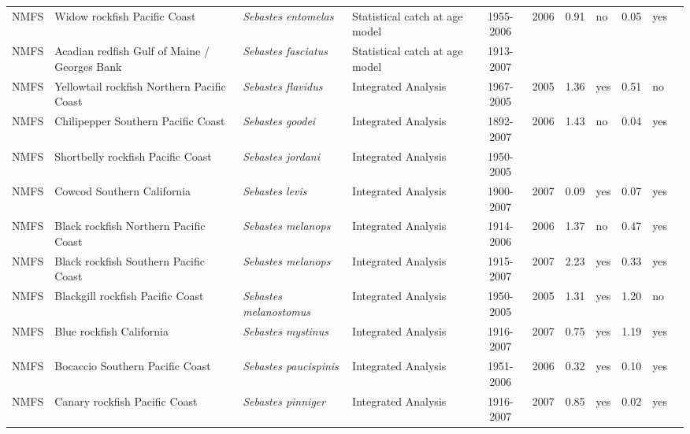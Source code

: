 \begin{longtable}{p{1.8cm}p{3.5cm}p{3.5cm}p{3cm}cccp{0.9cm}cp{0.9cm}c}
  NMFS & Widow rockfish Pacific Coast & \textit{Sebastes entomelas} & Statistical catch at age model & 1955-2006 & 2006 & 0.91 & no & 0.05 & yes & \cite{NWFSC-WROCKPCOAST-2007-widow.pdf} \\ 
  NMFS & Acadian redfish Gulf of Maine / Georges Bank & \textit{Sebastes fasciatus} & Statistical catch at age model & 1913-2007 &  &  &  &  &  & \cite{AcadianRedfish2008.pdf} \\ 
  NMFS & Yellowtail rockfish Northern Pacific Coast & \textit{Sebastes flavidus} & Integrated Analysis & 1967-2005 & 2005 & 1.36 & yes & 0.51 & no & \cite{2005_SAFE_yellowtail.pdf} \\ 
  NMFS & Chilipepper Southern Pacific Coast & \textit{Sebastes goodei} & Integrated Analysis & 1892-2007 & 2006 & 1.43 & no & 0.04 & yes & \cite{NWFSC-CHILISPCOAST-2007-Chilipepper CA OR.pdf} \\ 
  NMFS & Shortbelly rockfish Pacific Coast & \textit{Sebastes jordani} & Integrated Analysis & 1950-2005 &  &  &  &  &  & \cite{SWFSC-SBELLYROCKPCOAST-2007-Shortbelly rockfish.pdf} \\ 
  NMFS & Cowcod Southern California & \textit{Sebastes levis} & Integrated Analysis & 1900-2007 & 2007 & 0.09 & yes & 0.07 & yes & \cite{NWFSC-COWCODSCAL-2007-Cowcod CA.pdf} \\ 
  NMFS & Black rockfish Northern Pacific Coast & \textit{Sebastes melanops} & Integrated Analysis & 1914-2006 & 2006 & 1.37 & no & 0.47 & yes & \cite{NWFSC-BLACKROCKNPCOAST-2007-Black rockfish NOR WA.pdf} \\ 
  NMFS & Black rockfish Southern Pacific Coast & \textit{Sebastes melanops} & Integrated Analysis & 1915-2007 & 2007 & 2.23 & yes & 0.33 & yes & \cite{NWFSC-BLACKROCKSPCOAST-2007-Black rockfish OR CA.pdf} \\ 
  NMFS & Blackgill rockfish  Pacific Coast & \textit{Sebastes melanostomus} & Integrated Analysis & 1950-2005 & 2005 & 1.31 & yes & 1.20 & no & \cite{2005-SAFE-Wcblackgill.pdf} \\ 
  NMFS & Blue rockfish California & \textit{Sebastes mystinus} & Integrated Analysis & 1916-2007 & 2007 & 0.75 & yes & 1.19 & yes & \cite{NWFSC-BLUEROCKCAL-2007-Blue rockfish CA.pdf} \\ 
  NMFS & Bocaccio Southern Pacific Coast & \textit{Sebastes paucispinis} & Integrated Analysis & 1951-2006 & 2006 & 0.32 & yes & 0.10 & yes & \cite{NWFSC-BOCACCSPCOAST-2007 Bocaccio.pdf} \\ 
  NMFS & Canary rockfish Pacific Coast & \textit{Sebastes pinniger} & Integrated Analysis & 1916-2007 & 2007 & 0.85 & yes & 0.02 & yes & \cite{NWFSC-CROCKPCOAST-2007-Canary.pdf} \\ 

\end{longtable}
